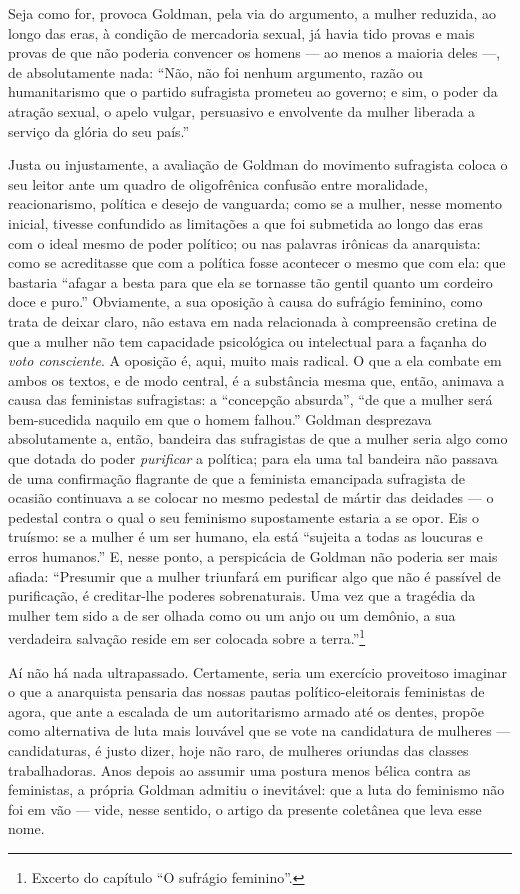 Seja
como for, provoca Goldman, pela via do argumento, a mulher reduzida, ao
longo das eras, à condição de mercadoria sexual, já havia tido provas e
mais provas de que não poderia convencer os homens --- ao menos a maioria
deles ---, de absolutamente nada: ``Não, não foi nenhum argumento, razão
ou humanitarismo que o partido sufragista prometeu ao governo; e sim, o
poder da atração sexual, o apelo vulgar, persuasivo e envolvente da
mulher liberada a serviço da glória do seu país.''

Justa ou injustamente, a avaliação de Goldman do movimento sufragista
coloca o seu leitor ante um quadro de oligofrênica confusão entre
moralidade, reacionarismo, política e desejo de vanguarda; como se a
mulher, nesse momento inicial, tivesse confundido as limitações a que
foi submetida ao longo das eras com o ideal mesmo de poder político; ou
nas palavras irônicas da anarquista: como se acreditasse que com a
política fosse acontecer o mesmo que com ela: que bastaria ``afagar a
besta para que ela se tornasse tão gentil quanto um cordeiro doce e
puro.'' Obviamente, a sua oposição à causa do sufrágio feminino, como
trata de deixar claro, não estava em nada relacionada à compreensão
cretina de que a mulher não tem capacidade psicológica ou intelectual
para a façanha do \textit{voto consciente}. A oposição é, aqui, muito mais
radical. O que a ela combate em ambos os textos, e de modo central, é a
substância mesma que, então, animava a causa das feministas sufragistas:
a ``concepção absurda'', ``de que a mulher será bem-sucedida naquilo em
que o homem falhou.'' Goldman desprezava absolutamente a, então,
bandeira das sufragistas de que a mulher seria algo como que dotada do
poder \textit{purificar} a política; para ela uma tal bandeira não passava de
uma confirmação flagrante de que a feminista emancipada sufragista de
ocasião continuava a se colocar no mesmo pedestal de mártir das deidades
--- o pedestal contra o qual o seu feminismo supostamente estaria a se
opor. Eis o truísmo: se a mulher é um ser humano, ela está ``sujeita a
todas as loucuras e erros humanos.'' E, nesse ponto, a perspicácia de
Goldman não poderia ser mais afiada: ``Presumir que a mulher triunfará
em purificar algo que não é passível de purificação, é creditar-lhe
poderes sobrenaturais. Uma vez que a tragédia da mulher tem sido a de
ser olhada como ou um anjo ou um demônio, a sua verdadeira salvação
reside em ser colocada sobre a terra.''\footnote{Excerto do capítulo ``O sufrágio feminino''.}

Aí não há nada ultrapassado. Certamente, seria um exercício proveitoso
imaginar o que a anarquista pensaria das nossas pautas
político-eleitorais feministas de agora, que ante a escalada de um
autoritarismo armado até os dentes, propõe como alternativa de luta mais
louvável que se vote na candidatura de mulheres --- candidaturas, é justo
dizer, hoje não raro, de mulheres oriundas das classes trabalhadoras.
Anos depois ao assumir uma postura menos bélica contra as feministas, a
própria Goldman admitiu o inevitável: que a luta do feminismo não foi em
vão --- vide, nesse sentido, o artigo da presente coletânea que leva esse
nome. 

